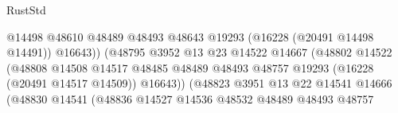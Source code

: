 \begin{lexlean}{RustStd}
\begin{coremodule}
                                                        @14498
                                                        @48610
                                                        @48489
                                                        @48493
                                                        @48643
                                                        @19293
                                                        (@16228 (@20491 @14498 @14491))
                                                        @16643))
                                                    (@48795
                                                      @3952
                                                      @13
                                                      @23
                                                      @14522
                                                      @14667
                                                      (@48802
                                                        @14522
                                                        (@48808
                                                          @14508
                                                          @14517
                                                          @48485
                                                          @48489
                                                          @48493
                                                          @48757
                                                          @19293
                                                          (@16228 (@20491 @14517 @14509))
                                                          @16643))
                                                      (@48823
                                                        @3951
                                                        @13
                                                        @22
                                                        @14541
                                                        @14666
                                                        (@48830
                                                          @14541
                                                          (@48836
                                                            @14527
                                                            @14536
                                                            @48532
                                                            @48489
                                                            @48493
                                                            @48757

\end{coremodule}
\end{lexlean}
